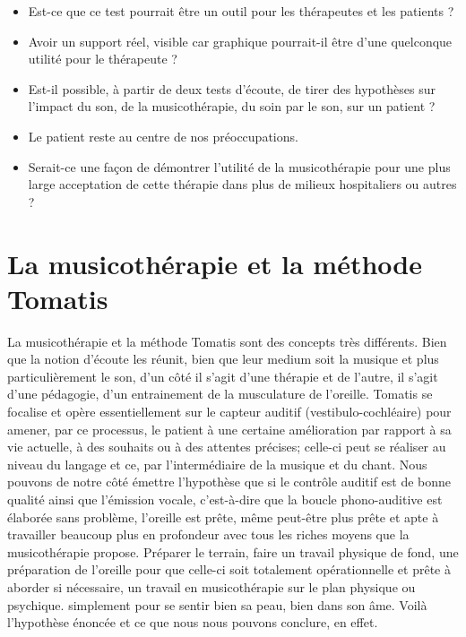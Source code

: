 \begin{itemize}
\item Est-ce que ce test pourrait être un outil pour les thérapeutes et
les patients ? 
\item Avoir un support réel, visible car graphique pourrait-il être d'une
quelconque utilité pour le thérapeute ?
\item Est-il possible, à partir de deux tests d'écoute, de tirer des hypothèses
sur l'impact du son, de la musicothérapie, du soin par le son, sur
un patient ?
\item Le patient reste au centre de nos préoccupations.
\item Serait-ce une façon de démontrer l'utilité de la musicothérapie
pour une plus large acceptation de 
cette thérapie dans plus de milieux hospitaliers ou autres ?


\end{itemize}

\section{La musicothérapie et la méthode Tomatis}

La musicothérapie et la méthode Tomatis sont des concepts très différents. Bien que la notion d'écoute les réunit, bien que leur medium soit la musique et plus particulièrement le son, d'un côté il s'agit d'une thérapie et de l'autre, il s'agit d'une pédagogie, d'un entrainement de la musculature de l'oreille. 
Tomatis se focalise et opère essentiellement sur le capteur auditif (vestibulo-cochléaire) pour amener, par ce processus, le patient à une certaine  amélioration par rapport à sa vie actuelle, à des souhaits ou à des attentes précises; celle-ci peut se réaliser au niveau du langage et ce, par l'intermédiaire de la musique et du chant. Nous pouvons de notre côté  émettre l'hypothèse que si le contrôle auditif est de bonne qualité ainsi que l'émission vocale, c'est-à-dire que la boucle phono-auditive est élaborée sans problème, l'oreille est prête, même peut-être plus prête et apte à travailler beaucoup plus en profondeur avec tous les riches moyens que la musicothérapie propose.
Préparer le terrain, faire un travail physique de fond, une
préparation de l'oreille pour que celle-ci soit totalement
opérationnelle et prête à aborder si nécessaire, un travail en
musicothérapie sur le plan physique ou psychique. simplement pour se
sentir bien sa peau, bien dans son âme.
Voilà l'hypothèse énoncée et ce que nous nous pouvons conclure, en effet.


